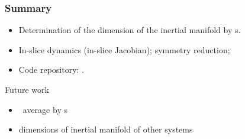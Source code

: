 
\begin{frame}%
  \frametitle{Summary}

  \begin{itemize}
  \item Determination of the dimension of the inertial manifold by \po s.
  \item In-slice dynamics (in-slice Jacobian);  symmetry reduction;
  \item Code repository: \ped.

  \end{itemize}

  \vfill

  Future work

  \begin{itemize}
  \item \spt\ average by \po s
  \item dimensions of inertial manifold of other systems
  \end{itemize}






\end{frame}
